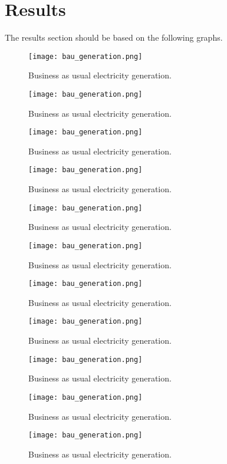 \section{Results}

The results section should be based on the following graphs.

\begin{figure}
	\texttt{[image: bau\_generation.png]}
	\caption{Business as usual electricity generation.}
	\label{fig:}
\end{figure}
\begin{figure}
	\texttt{[image: bau\_generation.png]}
	\caption{Business as usual electricity generation.}
	\label{fig:}
\end{figure}
\begin{figure}
	\texttt{[image: bau\_generation.png]}
	\caption{Business as usual electricity generation.}
	\label{fig:}
\end{figure}
\begin{figure}
	\texttt{[image: bau\_generation.png]}
	\caption{Business as usual electricity generation.}
	\label{fig:}
\end{figure}
\begin{figure}
	\texttt{[image: bau\_generation.png]}
	\caption{Business as usual electricity generation.}
	\label{fig:}
\end{figure}
\begin{figure}
	\texttt{[image: bau\_generation.png]}
	\caption{Business as usual electricity generation.}
	\label{fig:}
\end{figure}
\begin{figure}
	\texttt{[image: bau\_generation.png]}
	\caption{Business as usual electricity generation.}
	\label{fig:}
\end{figure}
\begin{figure}
	\texttt{[image: bau\_generation.png]}
	\caption{Business as usual electricity generation.}
	\label{fig:}
\end{figure}
\begin{figure}
	\texttt{[image: bau\_generation.png]}
	\caption{Business as usual electricity generation.}
	\label{fig:}
\end{figure}
\begin{figure}
	\texttt{[image: bau\_generation.png]}
	\caption{Business as usual electricity generation.}
	\label{fig:}
\end{figure}
\begin{figure}
	\texttt{[image: bau\_generation.png]}
	\caption{Business as usual electricity generation.}
	\label{fig:}
\end{figure}
